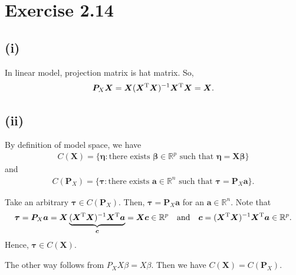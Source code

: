 \section*{Exercise 2.14}
\subsection*{(i)}
In linear model, projection matrix is hat matrix. So,
\begin{align*}
\bm{P}_{X}\bm{X} = \bm{X}(\bm{X}^{\rm T}\bm{X})^{-1}\bm{X}^{\rm T}\bm{X} = \bm{X}.
\end{align*}

\subsection*{(ii)}
By definition of model space, we have
\begin{align*}
C(\bm{X}) = \{\bm{\eta}: \mbox{there exists $\bm{\beta} \in \mathbb{R}^{p}$ such that $\bm{\eta} = \bm{X}\bm{\beta}$}\}
\end{align*}
and
\begin{align*}
C(\bm{P}_{X}) = \{\bm{\tau}: \mbox{there exists $\bm{a} \in \mathbb{R}^{n}$ such that $\bm{\tau} = \bm{P}_{X}\bm{a}$}\}.
\end{align*}

Take an arbitrary $\bm{\tau} \in C(\bm{P}_{X})$. Then, $\bm{\tau} = \bm{P}_{X}\bm{a}$ for an $\bm{a} \in \mathbb{R}^{n}$.
Note that
\begin{align*}
\bm{\tau} = \bm{P}_{X}\bm{a} =  \bm{X}\underbrace{(\bm{X}^{\rm T}\bm{X})^{-1}\bm{X}^{\rm T}\bm{a}}_{\bm{c}} = \bm{X}\bm{c} \in \mathbb{R}^{p} \quad \mbox{and} \quad \bm{c} = (\bm{X}^{\rm T}\bm{X})^{-1}\bm{X}^{\rm T}\bm{a} \in \mathbb{R}^{p}.
\end{align*}
Hence, $\bm{\tau} \in C(\bm{X})$.

The other way follows from $P_X X \beta = X \beta$. Then we have $C(\bm{X}) = C(\bm{P}_{X})$.